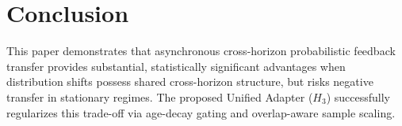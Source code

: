 \documentclass{article}
\begin{document}
\section{Conclusion}
This paper demonstrates that asynchronous cross-horizon probabilistic feedback transfer provides substantial, statistically significant advantages when distribution shifts possess shared cross-horizon structure, but risks negative transfer in stationary regimes. The proposed Unified Adapter ($H_3$) successfully regularizes this trade-off via age-decay gating and overlap-aware sample scaling.
\end{document}
